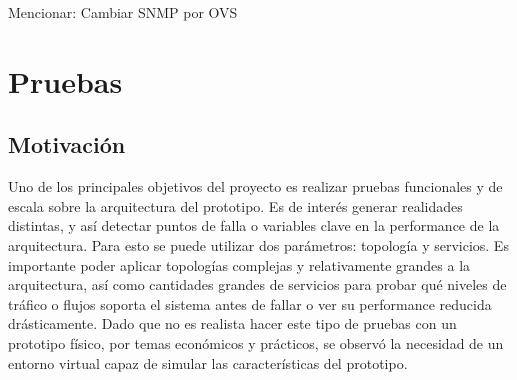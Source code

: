 \documentclass[a4paper,12pt]{report}
\begin{document}
\tableofcontents

Mencionar:
Cambiar SNMP por OVS

\chapter{Pruebas}
\section{Motivación}
Uno de los principales objetivos del proyecto es realizar pruebas funcionales y de escala sobre la arquitectura del prototipo. Es de interés generar realidades distintas, y así detectar puntos de falla o variables clave en la performance de la arquitectura. Para esto se puede utilizar dos parámetros: topología y servicios. Es importante poder aplicar topologías complejas y relativamente grandes a la arquitectura, así como cantidades grandes de servicios para probar qué niveles de tráfico o flujos soporta el sistema antes de fallar o ver su performance reducida drásticamente. Dado que no es realista hacer este tipo de pruebas con un prototipo físico, por temas económicos y prácticos, se observó la necesidad de un entorno virtual capaz de simular las características del prototipo.




\end{document}
